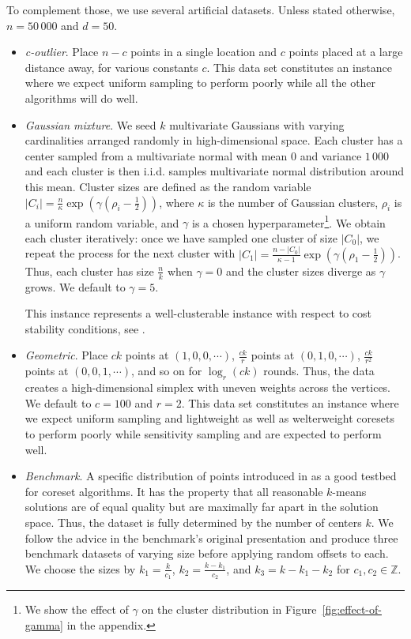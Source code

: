 To complement those, we use several artificial datasets. Unless stated otherwise, $n = 50\,000$ and $d=50$.
\begin{itemize}
    \item \emph{c-outlier}. Place $n-c$ points in a single location and $c$ points placed at a large distance away, for various constants $c$. 
	This data set constitutes an instance where we expect uniform sampling to perform poorly while all the other algorithms will do well.

    \item \emph{Gaussian mixture}. We seed $k$ multivariate Gaussians with varying cardinalities arranged randomly in high-dimensional space.  Each cluster has a center sampled from a multivariate normal with mean $0$ and variance $1\,000$ and each cluster is then i.i.d. samples multivariate normal distribution around
        this mean. Cluster sizes are defined as the random variable $|C_i| = \frac{n}{\kappa} \exp \left( \gamma(\rho_i - \frac{1}{2}) \right)$, where $\kappa$
        is the number of Gaussian clusters, $\rho_i$ is a uniform random variable, and $\gamma$ is a chosen hyperparameter\footnote{We show the effect of
        $\gamma$ on the cluster distribution in Figure~\ref{fig:effect-of-gamma} in the appendix.}. We obtain each cluster iteratively: once we have sampled one cluster of size
        $|C_0|$, we repeat the process for the next cluster with $|C_1| = \frac{n - |C_0|}{\kappa-1}\exp \left( \gamma(\rho_1 - \frac{1}{2}) \right)$.  Thus,
        each cluster has size $\frac{n}{k}$ when $\gamma = 0$ and the cluster sizes diverge as $\gamma$ grows. We default to $\gamma = 5$.
        
  This instance represents a well-clusterable instance with respect to cost stability conditions, see \cite{AwS12,Cohen-AddadS17,KuK10,ORSS12}.

    \item \emph{Geometric}. Place $c k$ points at $(1, 0, 0, \cdots)$, $\frac{ck}{r}$ points at $(0, 1, 0, \cdots)$, $\frac{ck}{r^2}$ points
        at $(0, 0, 1, \cdots)$, and so on for $\log_r (ck)$ rounds. Thus, the data creates a high-dimensional simplex with uneven weights across the vertices. We
        default to $c = 100$ and $r=2$. 
	This data set constitutes an instance where we expect uniform sampling and lightweight as well as welterweight coresets to perform poorly while sensitivity sampling and \fkmeans are expected to perform well.

    \item \emph{Benchmark}. A specific distribution of points introduced in \cite{chrisESA} as a good testbed for coreset algorithms.  It has the property that
        all reasonable $k$-means solutions are of equal quality but are maximally far apart in the solution space. Thus, the dataset is fully determined by the
        number of centers $k$. We follow the advice in the benchmark's original presentation and produce three benchmark datasets of varying size before
        applying random offsets to each. We choose the sizes by $k_1 = \frac{k}{c_1}$, $k_2 = \frac{k - k_1}{c_2}$, and $k_3 = k - k_1 - k_2$ for $c_1, c_2 \in
        \mathbb{Z}$.

\end{itemize}

